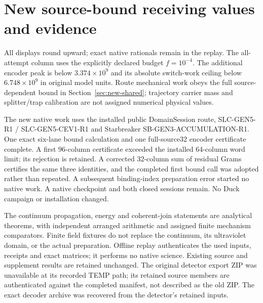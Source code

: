 


















\section{New source-bound receiving values and evidence}
\begin{table}[t]\centering\small\end{table}
All displays round upward; exact native rationals remain in the replay.
The all-attempt column uses the explicitly declared budget $f=10^{-4}$.
The additional encoder peak is below $3.374\times10^9$ and its absolute
switch-work ceiling below $6.748\times10^9$ in original model units.
Route mechanical work obeys the full source-dependent bound in
Section~\ref{sec:new-shared}; trajectory carrier mass and splitter/trap
calibration are not assigned numerical physical values.

The new native work uses the installed public DomainSession route,
SLC-GEN5-R1 / SLC-GEN5-CEV1-R1 and Starbreaker SB-GEN3-ACCUMULATION-R1.
One exact six-lane bound calculation and one full-source32 encoder
certificate complete. A first 96-column certificate exceeded the installed
64-column word limit; its rejection is retained. A corrected 32-column
sum of residual Grams certifies the same three identities, and the
completed first bound call was adopted rather than repeated. A subsequent
binding-index preparation error started no native work. A native checkpoint
and both closed sessions remain. No Duck campaign or installation changed.

The continuum propagation, energy and coherent-join statements are
analytical theorems, with independent arranged arithmetic and assigned
finite mechanism comparators. Finite field fixtures do not replace the
continuum, its ultraviolet domain, or the actual preparation. Offline
replay authenticates the used inputs, receipts and exact matrices; it
performs no native science. Existing source and supplement results are
retained unchanged. The original detector export ZIP was unavailable at
its recorded TEMP path; its retained source members are authenticated
against the completed manifest, not described as the old ZIP. The exact
decoder archive was recovered from the detector's retained inputs.

